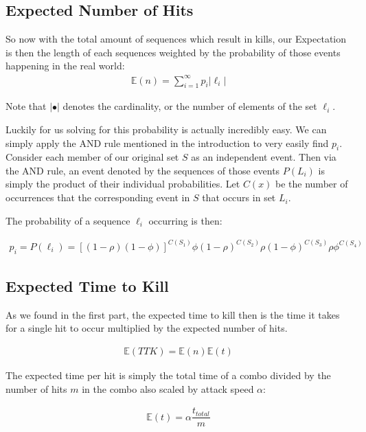 \documentclass{article}
\begin{document}
\subsection{Expected Number of Hits}

So now with the total amount of sequences which result in kills, our Expectation is then the length of each sequences weighted by the probability of those events happening in the real world:
\begin{align*}
\mathbb{E}(n) = \sum_{i=1}^{\infty} p_i |\ell_i|
\end{align*}

Note that $|•|$ denotes the cardinality, or the number of elements of the set $\ell_i$.

Luckily for us solving for this probability is actually incredibly easy. We can simply apply the AND rule mentioned in the introduction to very easily find $p_i$. Consider each member of our original set $S$ as an independent event. Then via the AND rule, an event denoted by the sequences of those events $P(L_i)$ is simply the product of their individual probabilities. Let $C(x)$ be the number of occurrences that the corresponding event in $S$ that occurs in set $L_i$.

 The probability of a sequence $\ell_i$ occurring is then:

\begin{align*}
p_i = P(\ell_i) = [(1-\rho)(1-\phi)]^{C(S_1)} \phi(1-\rho)^{C(S_2)} \rho(1-\phi)^{C(S_3)} \rho\phi^{C(S_4)}
\end{align*}

\subsection{Expected Time to Kill}

As we found in the first part, the expected time to kill then is the time it takes for a single hit to occur multiplied by the expected number of hits.

\begin{align*}
\mathbb{E}(TTK) = \mathbb{E}(n) \mathbb{E}(t)
\end{align*}

The expected time per hit is simply the total time of a combo divided by the number of hits $m$ in the combo also scaled by attack speed $\alpha$:

\begin{align*}
\mathbb{E}(t) = \alpha \dfrac{t_{total}}{m}
\end{align*}
\end{document}
